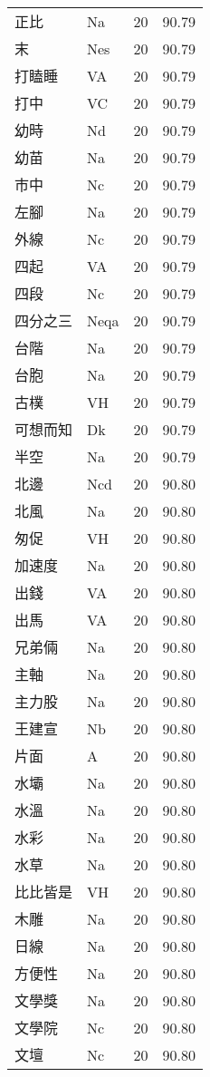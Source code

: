 \documentclass[twocolumn]{book}
\begin{document}
\begin{supertabular}{llrr}
正比 & Na & 20 &  90.79\\
末 & Nes & 20 &  90.79\\
打瞌睡 & VA & 20 &  90.79\\
打中 & VC & 20 &  90.79\\
幼時 & Nd & 20 &  90.79\\
幼苗 & Na & 20 &  90.79\\
市中 & Nc & 20 &  90.79\\
左腳 & Na & 20 &  90.79\\
外線 & Nc & 20 &  90.79\\
四起 & VA & 20 &  90.79\\
四段 & Nc & 20 &  90.79\\
四分之三 & Neqa & 20 &  90.79\\
台階 & Na & 20 &  90.79\\
台胞 & Na & 20 &  90.79\\
古樸 & VH & 20 &  90.79\\
可想而知 & Dk & 20 &  90.79\\
半空 & Na & 20 &  90.79\\
北邊 & Ncd & 20 &  90.80\\
北風 & Na & 20 &  90.80\\
匆促 & VH & 20 &  90.80\\
加速度 & Na & 20 &  90.80\\
出錢 & VA & 20 &  90.80\\
出馬 & VA & 20 &  90.80\\
兄弟倆 & Na & 20 &  90.80\\
主軸 & Na & 20 &  90.80\\
主力股 & Na & 20 &  90.80\\
王建宣 & Nb & 20 &  90.80\\
片面 & A & 20 &  90.80\\
水壩 & Na & 20 &  90.80\\
水溫 & Na & 20 &  90.80\\
水彩 & Na & 20 &  90.80\\
水草 & Na & 20 &  90.80\\
比比皆是 & VH & 20 &  90.80\\
木雕 & Na & 20 &  90.80\\
日線 & Na & 20 &  90.80\\
方便性 & Na & 20 &  90.80\\
文學獎 & Na & 20 &  90.80\\
文學院 & Nc & 20 &  90.80\\
文壇 & Nc & 20 &  90.80\\

\end{supertabular}
\end{document}
